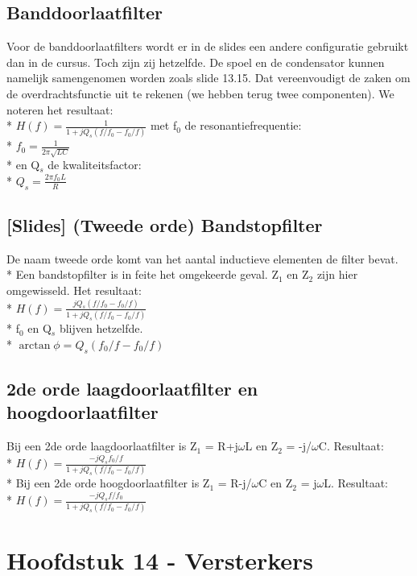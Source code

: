 \documentclass[10pt]{article}
\begin{document}
\subsection{Banddoorlaatfilter}
Voor de banddoorlaatfilters wordt er in de slides een andere configuratie gebruikt dan in de cursus. Toch zijn zij hetzelfde. De spoel en de condensator kunnen namelijk samengenomen worden zoals slide 13.15. Dat vereenvoudigt de zaken om de overdrachtsfunctie uit te rekenen (we hebben terug twee componenten). We noteren het resultaat:\\*
$H(f) = \frac{1}{1+jQ_s(f/f_0-f_0/f)}$ met f$_0$ de resonantiefrequentie:\\*
$f_0 = \frac{1}{2\pi\sqrt{LC}}$\\* en Q$_s$ de kwaliteitsfactor:\\*
$Q_s = \frac{2\pi f_0L}{R}$
\subsection{[Slides] (Tweede orde) Bandstopfilter}
De naam tweede orde komt van het aantal inductieve elementen de filter bevat.\\*
Een bandstopfilter is in feite het omgekeerde geval. Z$_1$ en Z$_2$ zijn hier omgewisseld. Het resultaat:\\*
$H(f) = \frac{jQ_s(f/f_0-f_0/f)}{1+jQ_s(f/f_0-f_0/f)}$\\*
f$_0$ en Q$_s$ blijven hetzelfde.\\*
$\arctan{\phi} = Q_s(f_0/f-f_0/f)$
\subsection{2de orde laagdoorlaatfilter en hoogdoorlaatfilter}
Bij een 2de orde laagdoorlaatfilter is Z$_1$ = R+j$\omega$L en Z$_2$ = -j/$\omega$C. Resultaat:\\*
$H(f) = \frac{-jQ_sf_0/f}{1+jQ_s(f/f_0-f_0/f)}$\\*
Bij een 2de orde hoogdoorlaatfilter is Z$_1$ = R-j/$\omega$C en Z$_2$ = j$\omega$L. Resultaat:\\*
$H(f) = \frac{-jQ_sf/f_0}{1+jQ_s(f/f_0-f_0/f)}$
\section{Hoofdstuk 14 - Versterkers}
\end{document}
